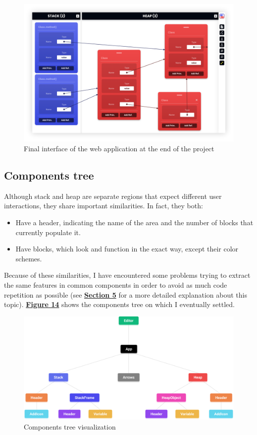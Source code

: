 \documentclass[]{usiinfbachelorproject}
\begin{document}
\begin{figure}[h!]
\centering
\includegraphics[width=\textwidth]{figures/final-interface.png}
\caption {Final interface of the web application at the end of the project}
\end{figure}

\subsection{Components tree}

Although stack and heap are separate regions that expect different user interactions, they share important similarities. In fact, they both:

\begin{itemize}
	\item Have a header, indicating the name of the area and the number of blocks that currently populate it.
	\item Have blocks, which look and function in the exact way, except their color schemes.
\end{itemize}

\noindent Because of these similarities, I have encountered some problems trying to extract the same features in common components in order to avoid as much code repetition as possible (see \hyperref[implementation]{\textbf{Section 5}} for a more detailed explanation about this topic). \hyperref[tree]{\textbf{Figure 14}} shows the components tree on which I eventually settled.

\bigskip

\begin{figure}[h!]
\centering
\includegraphics[width=\textwidth]{figures/tree.png}
\caption {Components tree visualization}
\label{tree}
\end{figure}
\end{document}
